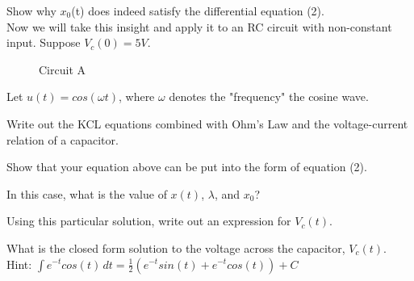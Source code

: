 \begin{enumerate}

\qitem Show why $x_{0}$(t) does indeed satisfy the differential equation (2).\\

Now we will take this insight and apply it to an RC circuit with non-constant input. Suppose $V_{c}(0) = 5V$.\\

\begin{figure}[H]
 \centering
 
 \caption{Circuit A}
\end{figure}

Let $u(t) = cos(\omega{}t)$, where $\omega{}$ denotes the "frequency" the cosine wave.

\sol{

}

\qitem Write out the KCL equations combined with Ohm's Law and the voltage-current relation of a capacitor.

\sol{

}

\qitem Show that your equation above can be put into the form of equation (2).

\sol{

}

\qitem In this case, what is the value of $x(t)$, $\lambda{}$, and $x_{0}$?

\sol{

}

\qitem Using this particular solution, write out an expression for $V_{c}(t)$.

\sol{

}

\qitem What is the closed form solution to the voltage across the capacitor, $V_{c}(t)$.\\

Hint: $\int \! e^{-t}cos(t) \, dt = \frac{1}{2}(e^{-t}sin(t) + e^{-t}cos(t)) + C$

\sol{

}

\end{enumerate}
